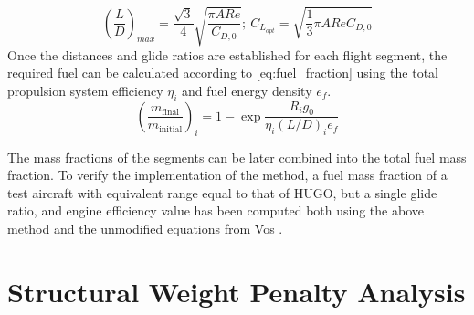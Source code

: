\begin{equation}
     \left( \frac{L}{D} \right)_{max} = \frac{\sqrt 3}{4}\sqrt{\frac{\pi ARe}{C_{D, 0}}};\ C_{L_{opt}} = \sqrt{{\frac13\pi ARe}{C_{D, 0}}}
 \end{equation}
Once the distances and glide ratios are established for each flight segment, the required fuel can be calculated according to \autoref{eq:fuel_fraction} \cite{Vos} using the total propulsion system efficiency $\eta_i$ and fuel energy density $e_f$.
\begin{equation}
\label{eq:fuel_fraction}
    \left(\frac{m_\text{final}}{m_\text{initial}}\right)_i = 1-\exp\frac{R_ig_0}{\eta_i (L/D)_i e_f}
\end{equation}

The mass fractions of the segments can be later combined into the total fuel mass fraction. To verify the implementation of the method, a fuel mass fraction of a test aircraft with equivalent range equal to that of HUGO, but a single glide ratio, and engine efficiency value has been computed both using the above method and the unmodified equations from Vos \cite{Vos}.

\section{Structural Weight Penalty Analysis}
\label{sec:structural_weight_penalty_analysis}


